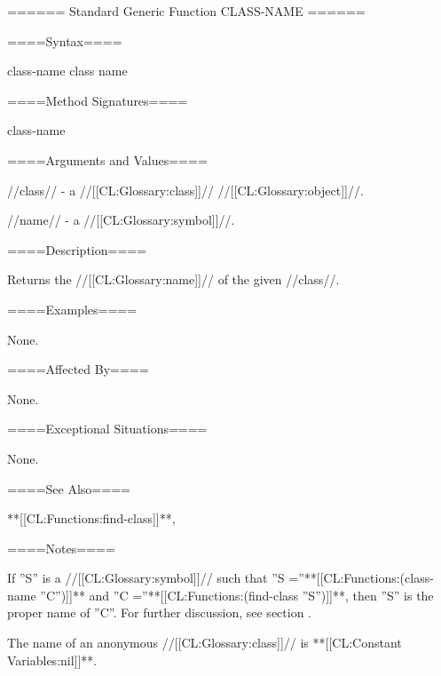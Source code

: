 ====== Standard Generic Function CLASS-NAME ======

====Syntax====

\DefgenWithValues class-name {class} {name}

====Method Signatures====

\Defmeth class-name {}

====Arguments and Values====

//class// - a //[[CL:Glossary:class]]// //[[CL:Glossary:object]]//.

//name// - a //[[CL:Glossary:symbol]]//.

====Description====

Returns the //[[CL:Glossary:name]]// of the given //class//.

====Examples====

None.

====Affected By====

None.

====Exceptional Situations====

None.

====See Also====

**[[CL:Functions:find-class]]**, {\secref\Classes}

====Notes====

If ''S'' is a //[[CL:Glossary:symbol]]// such that ''S =''**[[CL:Functions:(class-name ''C'')]]** and ''C =''**[[CL:Functions:(find-class ''S'')]]**, then ''S'' is the proper name of ''C''. For further discussion, see section {\secref\Classes}.

The name of an anonymous //[[CL:Glossary:class]]// is **[[CL:Constant Variables:nil]]**.

